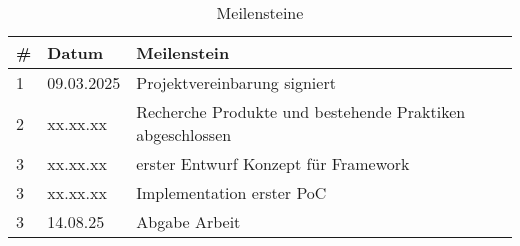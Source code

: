 \begin{table}[H]
    \centering
    \begin{tabularx}{\textwidth}{|l|l|X|}
        \hline
        \textbf{\#} & \textbf{Datum} & \textbf{Meilenstein} \\
        \hline
        1 & 09.03.2025 & Projektvereinbarung signiert
        \\
        \hline
        2 & xx.xx.xx & Recherche Produkte und bestehende Praktiken abgeschlossen
        \\
        \hline
        3 & xx.xx.xx & erster Entwurf Konzept für Framework
        \\
        \hline
        3 & xx.xx.xx & Implementation erster PoC
        \\
        \hline
        3 & 14.08.25 & Abgabe Arbeit
        \\
        \hline
    \end{tabularx}
    \caption{Meilensteine}
    \label{tab:milestones}
\end{table}